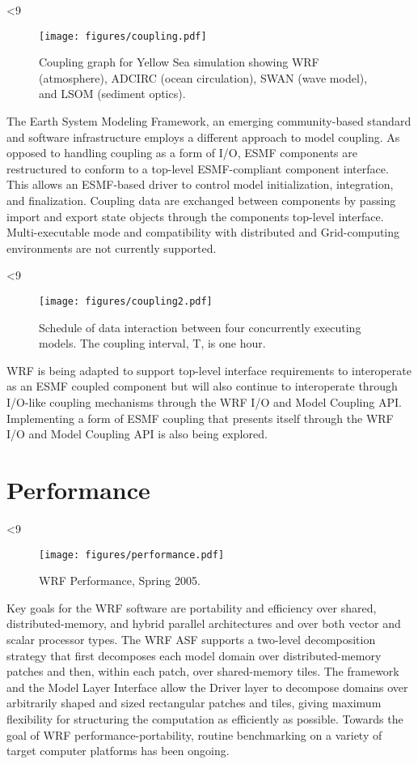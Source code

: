 %
%
\ifnum{}<9
\begin{figure} 
  \centering
  \texttt{[image: figures/coupling.pdf]}
  \caption{\label{figure:6}Coupling graph for Yellow Sea simulation showing WRF (atmosphere),
           ADCIRC (ocean circulation), SWAN (wave model), and LSOM (sediment optics).}
\end{figure}
\fi

The Earth System Modeling Framework, an emerging community-based standard 
and software infrastructure employs a different approach to model coupling. As 
opposed to handling coupling as a form of I/O, ESMF components are restructured 
to conform to a top-level ESMF-compliant component interface. This allows an 
ESMF-based driver to control model initialization, integration, and finalization. 
Coupling data are exchanged between components by passing import and export 
state objects through the components top-level interface.  Multi-executable mode
and compatibility with distributed and Grid-computing environments are
not currently supported.

%
%
\ifnum{}<9
\begin{figure}
  \centering
  \texttt{[image: figures/coupling2.pdf]}
  \caption{\label{figure:7}Schedule of data interaction between four concurrently executing
           models. The coupling interval, T, is one hour.}
\end{figure}
\fi

WRF is being adapted to support top-level interface requirements to
interoperate as an ESMF coupled component but will also continue to
interoperate through I/O-like coupling mechanisms through the WRF I/O
and Model Coupling API. Implementing a form of ESMF coupling that
presents itself through the WRF I/O and Model Coupling API is also
being explored.

\section{Performance}

%
%
\ifnum{}<9
\begin{figure}
  \centering
  \texttt{[image: figures/performance.pdf]}
  \caption{\label{figure:performance} WRF Performance, Spring 2005.}
\end{figure}
\fi

Key goals for the WRF software are portability and efficiency over
shared, distributed-memory, and hybrid parallel architectures and over
both vector and scalar processor types. The WRF ASF supports a
two-level decomposition strategy that first decomposes each model
domain over distributed-memory patches and then, within each patch,
over shared-memory tiles. The framework and the Model Layer Interface
allow the Driver layer to decompose domains over arbitrarily shaped and
sized rectangular patches and tiles, giving maximum flexibility for
structuring the computation as efficiently as possible. Towards the
goal of WRF performance-portability, routine benchmarking on a variety
of target computer platforms has been ongoing.

